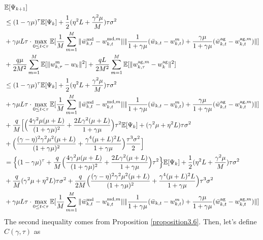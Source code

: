 \documentclass[11pt]{article}
\begin{document}
\begin{align*}
    &\mathbb{E}[\Psi_{k+1}] \\
    &\leq (1-\gamma\mu)^\tau \mathbb{E}[\Psi_k] + \frac{1}{2}(\eta^2 L + \frac{\gamma^2\mu}{M})\tau\sigma^2 \\
    &+ \gamma\mu L \tau \cdot \max_{0\leq t <\tau} \mathbb{E}[\frac{1}{M} \sum_{m=1}^M \|\Bar{w}_{k, t}^{\textrm{md}} - w_{k, t}^{\textrm{md}, m}\|\|\frac{1}{1+\gamma\mu}(\Bar{w}_{k, t} - w_{k, t}^m) + \frac{\gamma\mu}{1+\gamma\mu}(\Bar{w}_{k, t}^{\textrm{ag}} - w_{k, t}^{\textrm{ag}, m})\|] \\
    &+ \frac{q\mu}{2M^2}\sum_{m=1}^M \mathbb{E}[\|w_{k, \tau}^m - w_k\|^2] + \frac{qL}{2M^2} \sum_{m=1}^M \mathbb{E}[\|w_{k, \tau}^{\textrm{ag}, m} - w_k^{\textrm{ag}}\|^2] \\
    &\leq (1-\gamma\mu)^\tau \mathbb{E}[\Psi_k] + \frac{1}{2}(\eta^2 L + \frac{\gamma^2\mu}{M})\tau\sigma^2 \\
    &+ \gamma\mu L \tau \cdot \max_{0\leq t <\tau} \mathbb{E}[\frac{1}{M} \sum_{m=1}^M \|\Bar{w}_{k, t}^{\textrm{md}} - w_{k, t}^{\textrm{md}, m}\|\|\frac{1}{1+\gamma\mu}(\Bar{w}_{k, t} - w_{k, t}^m) + \frac{\gamma\mu}{1+\gamma\mu}(\Bar{w}_{k, t}^{\textrm{ag}} - w_{k, t}^{\textrm{ag}, m})\|] \\
    &+ \frac{q}{M}\Big[ \Big( \frac{4\gamma^2\mu(\mu+L)}{(1+\gamma\mu)^2} + \frac{2L\gamma^2(\mu+L)}{1+\gamma\mu}\Big)\tau^2 \mathbb{E}[\Psi_k] + (\gamma^2\mu+\eta^2 L)\tau\sigma^2 \\
    &+ \Big( \frac{(\gamma-\eta)^2\gamma^2\mu^2(\mu+L)}{(1+\gamma\mu)^2} + \frac{\gamma^4(\mu+L)^2 L}{1+\gamma\mu} \Big) \frac{\tau^3\sigma^2}{2}\Big] \\
    &= \Big\{(1-\gamma\mu)^\tau + \frac{q}{M}\Big( \frac{4\gamma^2\mu(\mu + L)}{(1+\gamma\mu)^2} + \frac{2L\gamma^2(\mu+L)}{1+\gamma\mu}\Big)\tau^2\Big\} \mathbb{E}[\Psi_k] + \frac{1}{2}(\eta^2 L+\frac{\gamma^2\mu}{M})\tau\sigma^2\\
     &+ \frac{q}{M}(\gamma^2\mu+\eta^2 L)\tau\sigma^2 + \frac{q}{2M}\Big(\frac{(\gamma-\eta)^2\gamma^2\mu^2(\mu+L)}{(1+\gamma\mu)^2} + \frac{\gamma^4(\mu+L)^2 L}{1+\gamma\mu}\Big)\tau^3\sigma^2\\
     &+ \gamma\mu L \tau \cdot \max_{0\leq t <\tau} \mathbb{E}[\frac{1}{M} \sum_{m=1}^M \|\Bar{w}_{k, t}^{\textrm{md}} - w_{k, t}^{\textrm{md}, m}\|\|\frac{1}{1+\gamma\mu}(\Bar{w}_{k, t} - w_{k, t}^m) + \frac{\gamma\mu}{1+\gamma\mu}(\Bar{w}_{k, t}^{\textrm{ag}} - w_{k, t}^{\textrm{ag}, m})\|]
\end{align*}
The second inequality comes from Proposition \ref{proposition3.6}. Then, let's define $C(\gamma, \tau)$ as
\end{document}
